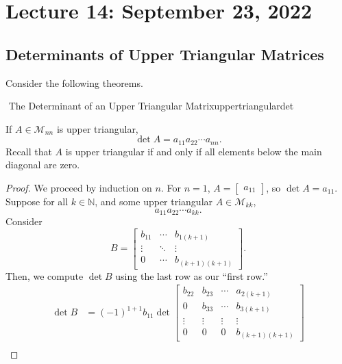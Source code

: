         \pagebreak

\section{Lecture 14: September 23, 2022}

    \subsection{Determinants of Upper Triangular Matrices}

        Consider the following theorems.
        \begin{theorem}{\Stop\,\,The Determinant of an Upper Triangular Matrix}{uppertriangulardet}

            If \(A\in\mathcal{M}_{nn}\) is upper triangular, 
            \begin{equation*}
                \det A = a_{11} a_{22} \cdots a_{nn}.
            \end{equation*}
            Recall that \(A\) is upper triangular if and only if all elements below the main diagonal are zero.
            \begin{proof}
                We proceed by induction on \(n\). For \(n=1\), \(A=\begin{bmatrix} a_{11} \end{bmatrix}\), so \(\det A = a_{11}\). Suppose for all \(k\in\mathbb{N}\), and some upper triangular \(A\in\mathcal{M}_{kk}\),
                \begin{equation*}
                    a_{11} a_{22} \cdots a_{kk}.
                \end{equation*}
                Consider 
                \begin{equation*}
                    B=\begin{bmatrix}
                        b_{11} & \cdots & b_{1(k+1)} \\
                        \vdots & \ddots & \vdots \\
                        0 & \cdots & b_{(k+1)(k+1)}
                    \end{bmatrix}.
                \end{equation*}
                Then, we compute \(\det B\) using the last row as our ``first row.''
                \begin{align*}
                    \det B &= (-1)^{1+1}b_{11}\det\begin{bmatrix} b_{22} & b_{23} & \cdots & a_{2(k+1)} \\ 0 & b_{33} & \cdots & b_{3(k+1)} \\ \vdots & \vdots & \vdots & \vdots \\ 0 & 0 & 0 & b_{(k+1)(k+1)} \end{bmatrix} \\

\end{align*}
\end{proof}
\end{theorem}

